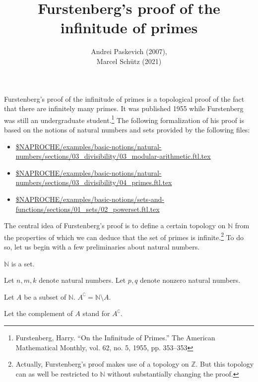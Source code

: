\documentclass{article}
\title{Furstenberg's proof of the infinitude of primes}
\author{Andrei Paskevich (2007), \\
Marcel Schütz (2021)}
\date{}
\begin{document}
  \maketitle

  Furstenberg's proof of the infinitude of primes is a topological proof of the
  fact that there are infinitely many primes.
  It was published 1955 while Furstenberg was still an undergraduate
  student.\footnote{Furstenberg, Harry. “On the Infinitude of Primes.” The
  American Mathematical Monthly, vol. 62, no. 5, 1955, pp. 353–353}
  The following formalization of his proof is based on the notions of natural
  numbers and sets provided by the following files:

  \begin{itemize}
    \item \url{$NAPROCHE/examples/basic-notions/natural-numbers/sections/03_divisibility/03_modular-arithmetic.ftl.tex}
    \item \url{$NAPROCHE/examples/basic-notions/natural-numbers/sections/03_divisibility/04_primes.ftl.tex}
    \item \url{$NAPROCHE/examples/basic-notions/sets-and-functions/sections/01_sets/02_powerset.ftl.tex}
  \end{itemize}


  The central idea of Furstenberg's proof is to define a certain topology on
  $\mathbb{N}$ from the properties of which we can deduce that the set of
  primes is infinite.\footnote{Actually, Furstenberg's proof makes use of a
  topology on $\mathbb{Z}$. But this topology can as well be restricted to
  $\mathbb{N}$ without substantially changing the proof.}
  To do so, let us begin with a few preliminaries about natural numbers.

  \begin{forthel}
    \begin{axiom}
      $\mathbb{N}$ is a set.
    \end{axiom}

    Let $n,m,k$ denote natural numbers.
    Let $p,q$ denote nonzero natural numbers.

    \begin{definition}
      Let $A$ be a subset of $\mathbb{N}$.
      $A^{\complement} = \mathbb{N} \setminus A$.
    \end{definition}

    Let the complement of $A$ stand for $A^{\complement}$.
  \end{forthel}
\end{document}
